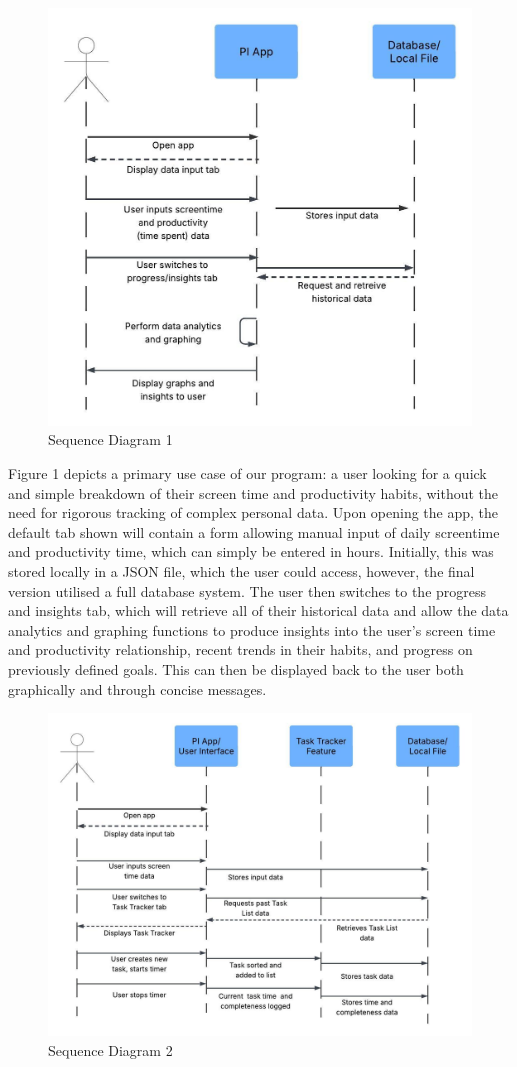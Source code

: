 \documentclass[12pt,a4paper]{article}
\begin{document}
\begin{figure}
    \centering
    \includegraphics[width=0.75\linewidth]{Sequence diagram.jpeg}
    \caption{Sequence Diagram 1}
    \label{fig:enter-label}
\end{figure}

Figure 1 depicts a primary use case of our program: a user looking for a quick and simple breakdown of their screen time and productivity habits, without the need for rigorous tracking of complex personal data. Upon opening the app, the default tab shown will contain a form allowing manual input of daily screentime and productivity time, which can simply be entered in hours. Initially, this was stored locally in a JSON file, which the user could access, however, the final version utilised a full database system. The user then switches to the progress and insights tab, which will retrieve all of their historical data and allow the data analytics and graphing functions to produce insights into the user’s screen time and productivity relationship, recent trends in their habits, and progress on previously defined goals. This can then be displayed back to the user both graphically and through concise messages. 
\newpage

\begin{figure}
    \centering
    \includegraphics[width=0.75\linewidth]{Sequence diagram 2.jpeg}
    \caption{Sequence Diagram 2}
    \label{fig:enter-label}
\end{figure}
\end{document}
